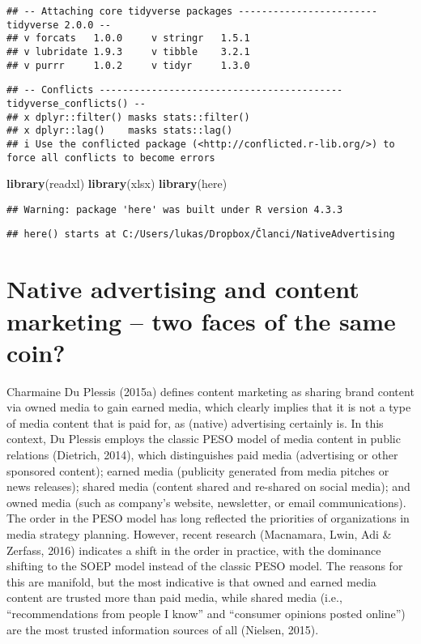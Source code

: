 \documentclass[preprint, 3p,
authoryear]{elsarticle} %
\newenvironment{Shaded}{\begin{snugshade}}{\end{snugshade}}
\newcommand{\FunctionTok}[1]{\textcolor[rgb]{0.13,0.29,0.53}{\textbf{#1}}}
\newcommand{\NormalTok}[1]{#1}
\begin{document}
\begin{verbatim}
## -- Attaching core tidyverse packages ------------------------ tidyverse 2.0.0 --
## v forcats   1.0.0     v stringr   1.5.1
## v lubridate 1.9.3     v tibble    3.2.1
## v purrr     1.0.2     v tidyr     1.3.0
\end{verbatim}

\begin{verbatim}
## -- Conflicts ------------------------------------------ tidyverse_conflicts() --
## x dplyr::filter() masks stats::filter()
## x dplyr::lag()    masks stats::lag()
## i Use the conflicted package (<http://conflicted.r-lib.org/>) to force all conflicts to become errors
\end{verbatim}

\begin{Shaded}
\begin{Highlighting}[]
\FunctionTok{library}\NormalTok{(readxl)}
\FunctionTok{library}\NormalTok{(xlsx)}
\FunctionTok{library}\NormalTok{(here)}
\end{Highlighting}
\end{Shaded}

\begin{verbatim}
## Warning: package 'here' was built under R version 4.3.3
\end{verbatim}

\begin{verbatim}
## here() starts at C:/Users/lukas/Dropbox/Članci/NativeAdvertising
\end{verbatim}

\hypertarget{native-advertising-and-content-marketing-two-faces-of-the-same-coin}{%
\section{Native advertising and content marketing -- two faces of the
same
coin?}\label{native-advertising-and-content-marketing-two-faces-of-the-same-coin}}

Charmaine Du Plessis (2015a) defines content marketing as sharing brand
content via owned media to gain earned media, which clearly implies that
it is not a type of media content that is paid for, as (native)
advertising certainly is. In this context, Du Plessis employs the
classic PESO model of media content in public relations (Dietrich,
2014), which distinguishes paid media (advertising or other sponsored
content); earned media (publicity generated from media pitches or news
releases); shared media (content shared and re-shared on social media);
and owned media (such as company's website, newsletter, or email
communications). The order in the PESO model has long reflected the
priorities of organizations in media strategy planning. However, recent
research (Macnamara, Lwin, Adi \& Zerfass, 2016) indicates a shift in
the order in practice, with the dominance shifting to the SOEP model
instead of the classic PESO model. The reasons for this are manifold,
but the most indicative is that owned and earned media content are
trusted more than paid media, while shared media (i.e.,
``recommendations from people I know'' and ``consumer opinions posted
online'') are the most trusted information sources of all (Nielsen,
2015).
\end{document}
